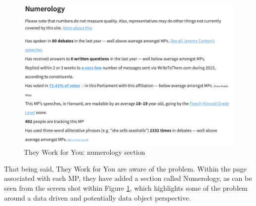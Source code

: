\begin{figure}[h]
  \centering
  \includegraphics[scale=0.3]{images/they-work-for-you-numerology}
  \caption{They Work for You: numerology section}
  \label{fig:they-work-for-you-numerology}
\end{figure}

That being said, They Work for You are aware of the problem.
Within the page associated with each MP, they have added a section called Numerology, 
as can be seen from the screen shot within Figure \ref{fig:they-work-for-you-numerology},
which highlights some of the problem around a data driven and potentially data object perspective.